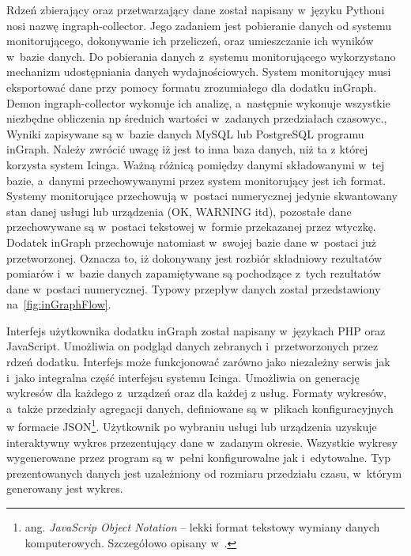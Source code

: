 Rdzeń zbierający oraz przetwarzający dane został napisany w~języku
Pythoni nosi nazwę ingraph-collector. Jego zadaniem jest pobieranie
danych od systemu monitorującego, dokonywanie ich przeliczeń, oraz
umieszczanie ich wyników w~bazie danych. Do pobierania danych
z~systemu monitorującego wykorzystano mechanizm udostępniania danych
wydajnościowych. System monitorujący musi eksportować dane przy pomocy
formatu zrozumiałego dla dodatku inGraph. Demon ingraph-collector
wykonuje ich analizę, a~następnie wykonuje wszystkie niezbędne
obliczenia np średnich wartości w~zadanych przedziałach czasowyc.,
Wyniki zapisywane są w~bazie danych MySQL lub PostgreSQL programu
inGraph. Należy zwrócić uwagę iż jest to inna baza danych, niż ta z
której korzysta system Icinga. Ważną różnicą pomiędzy danymi
składowanymi w~tej bazie, a~danymi przechowywanymi przez system
monitorujący jest ich format. Systemy monitorujące przechowują
w~postaci numerycznej jedynie skwantowany stan danej usługi lub
urządzenia (OK, WARNING itd), pozostałe dane przechowywane są
w~postaci tekstowej w~formie przekazanej przez wtyczkę. Dodatek
inGraph przechowuje natomiast w~swojej bazie dane w~postaci już
przetworzonej. Oznacza to, iż dokonywany jest rozbiór składniowy
rezultatów pomiarów i~w~bazie danych zapamiętywane są pochodzące
z~tych rezultatów dane w~postaci numerycznej. Typowy przepływ danych
został przedstawiony na~\ref{fig:inGraphFlow}.

Interfejs użytkownika dodatku inGraph został napisany w~językach PHP
oraz JavaScript. Umożliwia on podgląd danych zebranych
i~przetworzonych przez rdzeń dodatku. Interfejs może funkcjonować
zarówno jako niezależny serwis jak i~jako integralna część interfejsu
systemu Icinga. Umożliwia on generację wykresów dla każdego z~urządzeń
oraz dla każdej z usług. Formaty wykresów, a~także przedziały
agregacji danych, definiowane są w~plikach konfiguracyjnych w formacie
JSON\footnote{ang. {\em JavaScrip Object Notation} -- lekki format
  tekstowy wymiany danych komputerowych. Szczegółowo opisany
  w~\cite{www:JSON}.}.  Użytkownik po wybraniu usługi lub urządzenia
uzyskuje interaktywny wykres przezentujący dane w~zadanym
okresie. Wszystkie wykresy wygenerowane przez program są w~pełni
konfigurowalne jak i~edytowalne. Typ prezentowanych danych jest
uzależniony od rozmiaru przedziału czasu, w~którym generowany jest
wykres. 

